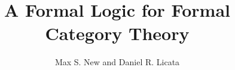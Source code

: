 \documentclass{llncs}
\begin{document}
\newcommand{\paramPresheaf}[1]{\mathcal P^{#1}}
\newcommand{\pmPresheaf}{\paramPresheaf\pm}
\newcommand{\posPresheaf}{\paramPresheaf+}
\newcommand{\negPresheaf}{\paramPresheaf-}
\newcommand{\negPresheafAppPtoX}[2]{#2\in #1}
\newcommand{\posPresheafAppPtoX}[2]{#1 \ni #2}
\newcommand{\negPresheafApp}{\negPresheafAppPtoX}
\newcommand{\posPresheafApp}{\posPresheafAppPtoX}

\newcommand{\graphProf}[3]{\sum_{{#1};{#2}} #3}

\newcommand{\algCtx}{\textrm{Ctx}}
\newcommand{\algSubst}{\textrm{Subst}}
\newcommand{\algTy}{\textrm{Type}}
\newcommand{\algTm}{\textrm{Term}}
\newcommand{\algCat}{\textrm{Cat}}
\newcommand{\algVarr}{\textrm{Functor}}
\newcommand{\algHCtx}{\textrm{ProfCtx}}
\newcommand{\algHSubst}{\textrm{ProfSubst}}
\newcommand{\algHarr}{\textrm{Prof}}
\newcommand{\algTrans}{\textrm{Trans}}
\newcommand{\algElts}{\textrm{Elts}}
\newcommand{\algEltsI}{\textrm{EltsI}}

\newcommand{\algLHom}{\textrm{LHom}}
\newcommand{\algLHomI}{\textrm{LHomI}}
\newcommand{\algLHomE}{\textrm{LHomE}}
\newcommand{\algRHom}{\textrm{RHom}}
\newcommand{\algRHomI}{\textrm{RHomI}}
\newcommand{\algRHomE}{\textrm{RHomE}}

\newcommand{\algUnit}{\textrm{Unit}}
\newcommand{\algUnitI}{\textrm{UnitI}}
\newcommand{\algUnitE}{\textrm{UnitE}}

\newcommand{\algTensor}{\textrm{Tensor}}
\newcommand{\algTensorI}{\textrm{TensorI}}
\newcommand{\algTensorE}{\textrm{TensorE}}

\newcommand{\algCatTy}{\textrm{Cat}}
\newcommand{\algCatQt}{\textrm{CatQt}}
\newcommand{\algCatUnqt}{\textrm{CatUnQt}}

\newcommand{\algTransTy}{\textrm{Trans}}
\newcommand{\algTransQt}{\textrm{TransQt}}
\newcommand{\algTransUnqt}{\textrm{TransUnQt}}

\newcommand{\algVarrQt}{\textrm{FunctQt}}
\newcommand{\algVarrUnqt}{\textrm{FunctUnQt}}

\newcommand{\quoth}[1]{\lceil{} {#1}\rceil{}}
\newcommand{\unquoth}[1]{\lfloor{} {#1}\rfloor{}}

\newcommand{\citet}[1]{\cite{#1}}
\newcommand{\citep}[1]{(\cite{#1})}

\title{A Formal Logic for Formal Category Theory }
\author{Max S. New and Daniel R. Licata}

\maketitle
\end{document}
